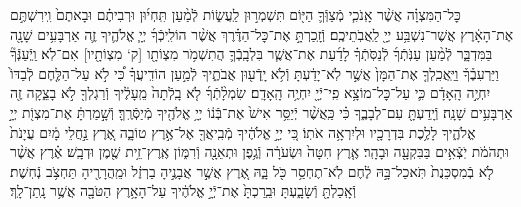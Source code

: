 \documentclass[twoside, openany, parskip=half, 11pt]{book}
\begin{document}
\begin{footnotesize}
\begin{multicols}{2}
כׇּל־הַמִּצְוָ֗ה אֲשֶׁ֨ר אָֽנֹכִ֧י מְֿצַוְּֿךָ֛ הַיּ֖וֹם תִּשְׁמְר֣וּן לַֽעֲשׂ֑וֹת לְֿמַ֨עַן תִּֽחְי֜וּן וּרְבִיתֶ֗ם וּבָאתֶם֙ וִֽירִשְׁתֶּ֣ם אֶת־הָאָ֔רֶץ אֲשֶׁר־נִשְׁבַּ֥ע יְיָ֖ לַֽאֲבֹֽתֵיכֶֽם׃ וְֿזָֽכַרְתָּ֣ אֶת־כׇּל־הַדֶּ֗רֶךְ אֲשֶׁ֨ר הוֹלִֽיכְֿךָ֜ יְיָ֧ אֱלֹהֶ֛יךָ זֶ֛ה אַרְבָּעִ֥ים שָׁנָ֖ה בַּמִּדְבָּ֑ר לְֿמַ֨עַן עַנֹּֽתְֿךָ֜ לְֿנַסֹּֽתְֿךָ֗ לָדַ֜עַת אֶת־אֲשֶׁ֧ר בִּלְבָֽבְֿךָ֛ הֲתִשְׁמֹ֥ר מִצְוֹתָ֖ו [ק‘ מִצְוֹתָ֖יו] אִם־לֹֽא׃ וַֽיְֿעַנְּֿךָ֘ וַיַּרְעִבֶ֒ךָ֒ וַיַּֽאֲכִֽלְךָ֤ אֶת־הַמָּן֙ אֲשֶׁ֣ר לֹֽא־יָדַ֔עְתָּ וְֿלֹ֥א יָֽדְֿע֖וּן אֲבֹתֶ֑יךָ לְֿמַ֣עַן הוֹדִֽיעֲךָ֗ כִּ֠י לֹ֣א עַל־הַלֶּ֤חֶם לְֿבַדּוֹ֙ יִחְיֶ֣ה הָֽאָדָ֔ם כִּ֛י עַל־כׇּל־מוֹצָ֥א פִֽי־יְֿיָ֖ יִחְיֶ֥ה הָֽאָדָֽם׃  שִׂמְלָ֨תְֿךָ֜ לֹ֤א בָֽלְֿתָה֙ מֵֽעָלֶ֔יךָ וְֿרַגְלְךָ֖ לֹ֣א בָצֵ֑קָה זֶ֖ה אַרְבָּעִ֥ים שָׁנָֽה׃ וְֿיָֽדַעְתָּ֖ עִם־לְבָבֶ֑ךָ כִּ֗י כַּֽאֲשֶׁ֨ר יְֿיַסֵּ֥ר אִישׁ֙ אֶת־בְּֿנ֔וֹ יְיָ֥ אֱלֹהֶ֖יךָ מְֿיַסְּֿרֶֽךָּ׃ וְֿשָׁ֣מַרְתָּ֔ אֶת־מִצְוֹ֖ת יְיָ֣ אֱלֹהֶ֑יךָ לָלֶ֥כֶת בִּדְרָכָ֖יו וּלְיִרְאָ֥ה אֹתֽוֹ׃ כִּ֚י יְיָ֣ אֱלֹהֶ֔יךָ מְֿבִֽיאֲךָ֖ אֶל־אֶ֣רֶץ טוֹבָ֑ה אֶ֚רֶץ נַ֣חֲלֵי מָ֔יִם עֲיָנֹת֙ וּתְהֹמֹ֔ת יֹֽצְֿאִ֥ים בַּבִּקְעָ֖ה וּבָהָֽר׃ אֶ֤רֶץ חִטָּה֙ וּשְׂעֹרָ֔ה וְֿגֶ֥פֶן וּתְאֵנָ֖ה וְֿרִמּ֑וֹן אֶֽרֶץ־זֵ֥ית שֶׁ֖מֶן וּדְבָֽשׁ׃ אֶ֗רֶץ אֲשֶׁ֨ר לֹ֤א בְֿמִסְכֵּנֻת֙ תֹּֽאכַל־בָּ֣הּ לֶ֔חֶם לֹֽא־תֶחְסַ֥ר כֹּ֖ל בָּ֑הּ אֶ֚רֶץ אֲשֶׁ֣ר אֲבָנֶ֣יהָ בַרְזֶ֔ל וּמֵֽהֲרָרֶ֖יהָ תַּחְצֹ֥ב נְֿחֽשֶׁת׃ וְֿאָֽכַלְתָּ֖ וְֿשָׂבָ֑עְתָּ וּבֵֽרַכְתָּ֙ אֶת־יְֿיָ֣ אֱלֹהֶ֔יךָ עַל־הָאָ֥רֶץ הַטֹּבָ֖ה אֲשֶׁ֥ר נָֽתַן־לָֽךְ׃


\end{multicols}
\end{footnotesize}
\end{document}

